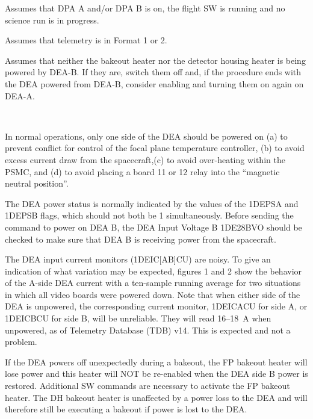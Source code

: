 \documentclass[11pt]{article}
\begin{document}
\vspace{0.15in}

\bi
\item Assumes that DPA A and/or DPA B is on, the flight SW is running and no 
science run is in progress.
\ei

\vspace{0.15in}

\bi
\item Assumes that telemetry is in Format 1 or 2.
\item Assumes that neither the bakeout heater nor the detector housing heater is
being powered by DEA-B. If they are, switch them off and, if the procedure ends
with the DEA powered from DEA-B, consider enabling and turning them on again
on DEA-A.
\ei

\normalsize
{} \\
\normalsize

In normal operations, only one side of the DEA should be powered on
(a) to prevent conflict for control of the focal plane temperature controller,
(b) to avoid excess current draw from the spacecraft,(c) to avoid over-heating
within the PSMC, and (d) to avoid placing a board 11 or 12 relay into the 
``magnetic neutral position''.

The DEA power status is normally indicated by the values of the 1DEPSA and
1DEPSB flags, which should not both be 1 simultaneously. Before sending the 
command to power on DEA B, the DEA Input Voltage B 1DE28BVO should 
be checked to make sure that DEA B is receiving power from the spacecraft.

The DEA input current monitors (1DEIC[AB]CU) are noisy.
To give an indication of what variation may be expected, figures 1 and 2
show the behavior of the A-side DEA current with a ten-sample running
average for two situations in which all video boards were powered down. Note that
when either side of the DEA is unpowered, the corresponding current monitor, 
1DEICACU for side A, or 1DEICBCU for side B, will be unreliable. They will read
16--18~A when unpowered, as of Telemetry Database (TDB) v14. This is expected and
not a problem.

If the DEA powers off unexpectedly during a bakeout, the FP bakeout 
heater will lose power and this heater will NOT be re-enabled when the DEA side B 
power is restored. Additional SW commands are necessary to activate the FP bakeout 
heater. The DH bakeout heater is unaffected by a power loss to the DEA and will 
therefore still be executing a bakeout if power is lost to the DEA.
\end{document}
